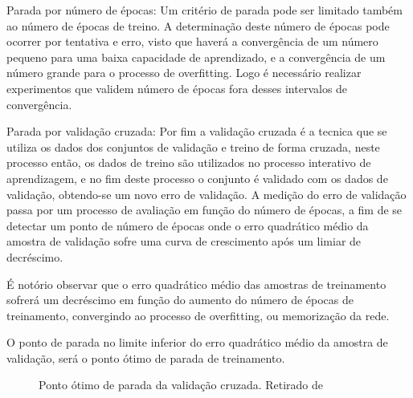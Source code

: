 \documentclass[	12pt, Times, openright, twoside, a4paper, english, brazil]{abntex2}
\begin{document}
            	Parada por número de épocas:
            	Um critério de parada pode ser limitado também ao número de épocas de treino. A determinação  deste número de épocas pode ocorrer por tentativa e erro, visto que haverá a convergência de um número pequeno para uma baixa capacidade de aprendizado, e a convergência de um número grande para o processo de overfitting. Logo é necessário realizar experimentos que validem número de épocas fora desses intervalos de convergência.
            	
            	Parada por validação cruzada:
            	Por fim a validação cruzada é a tecnica que se utiliza os dados dos conjuntos de validação e treino de forma cruzada, neste processo então, os dados de treino são utilizados no processo interativo de aprendizagem, e no fim deste processo o conjunto é validado com os dados de validação, obtendo-se um novo erro de validação.
            	A medição do erro de validação passa por um processo de avaliação em função do número de épocas, a fim de se detectar um ponto de número de épocas onde o erro quadrático médio da amostra de validação sofre uma curva de crescimento após um limiar de decréscimo.
            	
            	É notório observar que o erro quadrático médio das amostras de treinamento sofrerá um decréscimo em função do aumento do número de épocas de treinamento, convergindo ao processo de overfitting, ou memorização da rede.
            	
            	O ponto de parada no limite inferior do erro quadrático médio da amostra de validação, será o ponto ótimo de parada de treinamento.
          	
          	\begin{figure}[!ht]
          		\caption{Ponto ótimo de parada da validação cruzada. Retirado de \cite{Flavia2014} \label{fig:validacaoCruzada}}
          	\end{figure}
        
\end{document}
